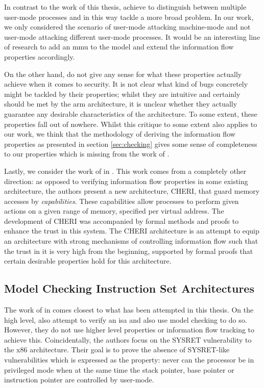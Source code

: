 In contrast to the work of this thesis, \citeauthor{KhakpourSD13} achieve to distinguish between multiple user-mode processes and in this way tackle a more broad problem.
In our work, we only considered the scenario of user-mode attacking machine-mode and not user-mode attacking different user-mode processes.
It would be an interesting line of research to add an \gls{mmu} to the model and extend the information flow properties accordingly.

On the other hand, \citeauthor{KhakpourSD13} do not give any sense for what these properties actually achieve when it comes to security.
It is not clear what kind of bugs concretely might be tackled by their properties; whilst they are intuitive and certainly should be met by the \gls{arm} architecture, it is unclear whether they actually guarantee any desirable characteristics of the architecture.
To some extent, these properties fall out of nowhere.
Whilst this critique to some extent also applies to our work, we think that the methodology of deriving the information flow properties as presented in section \ref{sec:checking} gives some sense of completeness to our properties which is missing from the work of \citeauthor{KhakpourSD13}.

Lastly, we consider the work of \citeauthor{Nienhuis19} in  \cite{Nienhuis19}.
This work comes from a completely other direction: as opposed to verifying information flow properties in some existing architecture, the authors present a new architecture, CHERI, that guard memory accesses by \textit{capabilities}.
These capabilities allow processes to perform given actions on a given range of memory, specified per virtual address.
The development of CHERI was accompanied by formal methods and proofs to enhance the trust in this system.
The CHERI architecture is an attempt to equip an architecture with strong mechanisms of controlling information flow such that the trust in it is very high from the beginning, supported by formal proofs that certain desirable properties hold for this architecture.

\subsection{Model Checking Instruction Set Architectures}
\label{sec:related-model-checking}

The work of \citeauthor{BradfieldS16} in  \cite{BradfieldS16} comes closest to what has been attempted in this thesis.
On the high level, \citeauthor{BradfieldS16} also attempt to verify an \gls{isa} and also use model checking to do so.
However, they do not use higher level properties or information flow tracking to achieve this.
Coincidentally, the authors focus on the SYSRET vulnerability to the x86 architecture.
Their goal is to prove the absence of SYSRET-like vulnerabilities which is expressed as the property: never can the processor be in privileged mode when at the same time the stack pointer, base pointer or instruction pointer are controlled by user-mode.

